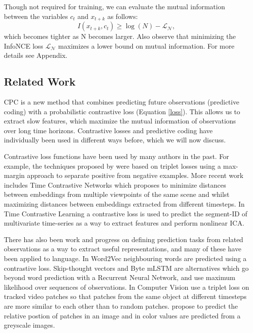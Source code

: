 Though not required for training, we can evaluate the mutual information between the variables $c_t$ and $x_{t+k}$ as follows:
$$
I(x_{t+k}, c_t) \geq \log(N)-\mathcal{L_{\text{N}}},
$$
which becomes tighter as N becomes larger. Also observe that minimizing the InfoNCE loss $\mathcal{L_{\text{N}}}$ maximizes a lower bound on mutual information. For more details see Appendix. 

\subsection{Related Work}
\label{related}

CPC is a new method that combines predicting future observations (predictive coding) with a probabilistic contrastive loss (Equation \ref{loss}). This allows us to extract slow features, which maximize the mutual information of observations over long time horizons. Contrastive losses and predictive coding have individually been used in different ways before, which we will now discuss.

Contrastive loss functions have been used by many authors in the past. For example, the techniques proposed by \cite{chopra2005learning, weinberger2009distance, schroff2015facenet} were based on triplet losses using a max-margin approach to separate positive from negative examples. More recent work includes Time Contrastive Networks \cite{sermanet2017time} which proposes to minimize distances between embeddings from multiple viewpoints of the same scene and whilst maximizing distances between embeddings extracted from different timesteps. In Time Contrastive Learning \cite{NIPS2016_6395} a contrastive loss is used to predict the segment-ID of multivariate time-series as a way to extract features and perform nonlinear ICA.

There has also been work and progress on defining prediction tasks from related observations as a way to extract useful representations, and many of these have been applied to language. In Word2Vec \cite{mikolov2013efficient} neighbouring words are predicted using a contrastive loss. Skip-thought vectors \cite{kiros2015skip} and Byte mLSTM \cite{radford2017learning} are alternatives which go beyond word prediction with a Recurrent Neural Network, and use maximum likelihood over sequences of observations. In Computer Vision \cite{wang2015unsupervised} use a triplet loss on tracked video patches so that patches from the same object at different timesteps are more similar to each other than to random patches. \cite{Doersch_2015_ICCV, noroozi2016unsupervised} propose to predict the relative postion of patches in an image and in \cite{zhang2016colorful} color values are predicted from a greyscale images.